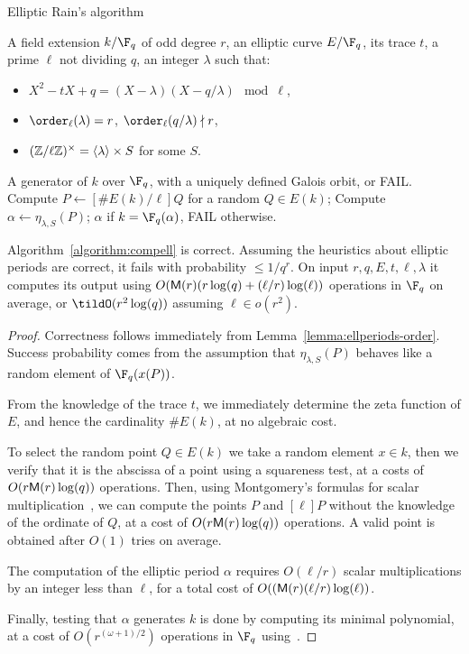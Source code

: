 \begin{algorithm}
  \caption{Elliptic Rain's algorithm}
\label{algorithm:compell}
  \begin{algorithmic}[1]
    \REQUIRE A field extension $k/\F_q$ of odd degree $r$,
    an elliptic curve $E/\F_q$, its trace $t$, a prime $\ell$ not dividing $q$,
    an integer $\lambda$ such that:
    \begin{itemize}
    \item $X^2 - tX + q = (X-\lambda)(X-q/\lambda) \mod\ell$,
    \item $\order_\ell(\lambda)=r$, $\order_\ell(q/\lambda)\nmid r$,
    \item $(\mathbb{Z}/\ell\mathbb{Z})^{\times} = \langle{\lambda}\rangle \times S$ for some $S$.
    \end{itemize}
    \ENSURE A generator of $k$ over $\F_q$, with a uniquely defined Galois orbit, or FAIL.
    \REPEAT
    \STATE Compute $P\leftarrow[\# E(k)/\ell]Q$ for a random $Q\in E(k)$;
    \STATE Compute $\alpha\leftarrow\eta_{\lambda,S}(P)$;
    \RETURN $\alpha$ if $k=\F_q(\alpha)$, FAIL otherwise.
  \end{algorithmic}
\end{algorithm}

\begin{proposition}
  Algorithm~\ref{algorithm:compell} is correct. Assuming the
  heuristics about elliptic periods are correct, it fails
  with probability $\le 1/q^r$.  On input
  $r,q,E,t,\ell,\lambda$ it computes its output using
  $O(\mathsf{M}(r)(r\log(q) + (\ell/r)\log(\ell))$ operations in $\F_q$ on average, or
  $\tildO(r^2\log(q))$ assuming $\ell\in o(r^2)$.
\end{proposition}
\begin{proof}
  Correctness follows immediately from
  Lemma~\ref{lemma:ellperiods-order}. Success probability comes from
  the assumption that $\eta_{\lambda,S}(P)$ behaves like a random element of
  $\F_q(x(P))$.

  From the knowledge of the trace $t$, we immediately determine the
  zeta function of $E$, and hence the cardinality $\# E(k)$, at
  no algebraic cost.

  To select the random point $Q\in E(k)$ we take a random
  element $x\in k$, then we verify that it is the abscissa of a
  point using a squareness test, at a costs of $O(r\mathsf{M}(r)\log(q))$
  operations. Then, using Montgomery's formulas for scalar
  multiplication~\cite{montgomery}, we can compute the points $P$ and
  $[\ell]P$ without the knowledge of the ordinate of $Q$, at a cost of
  $O(r\mathsf{M}(r)\log(q))$ operations. A valid point is obtained after
  $O(1)$ tries on average.

  The computation of the elliptic period $\alpha$ requires $O(\ell/r)$ scalar
  multiplications by an integer less than $\ell$, for a total cost of
  $O((\mathsf{M}(r)(\ell/r)\log(\ell))$.

  Finally, testing that $\alpha$ generates $k$ is done by computing
  its minimal polynomial, at a cost of $O(r^{(\omega+1)/2})$ operations in
  $\F_q$ using~\cite{shoup93}.
\end{proof}


